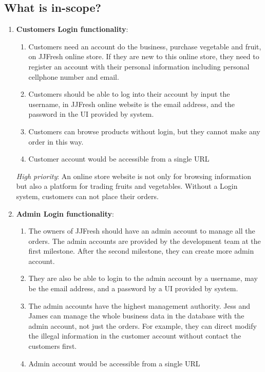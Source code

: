 \documentclass{report}
\begin{document}
\subsection{What is in-scope?}
\begin{enumerate}
  \item \textbf{Customers Login functionality}:
  \begin{enumerate}
    \item Customers need an account do the business, purchase vegetable and fruit, on JJFresh online store. If they are new to this online store, they need to register an account with their personal information including personal cellphone number and email.
    \item Customers should be able to log into their account by input the username, in JJFresh online website is the email address, and the password in the UI provided by system.
    \item Customers can browse products without login, but they cannot make any order in this way.
    \item Customer account would be accessible from a single URL
  \end{enumerate}

  \textit{High priority}: An online store website is not only for browsing information but also a platform for trading fruits and vegetables. Without a Login system, customers can not place their orders.

  \item \textbf{Admin Login functionality}:
  \begin{enumerate}
    \item The owners of JJFresh should have an admin account to manage all the orders. The admin accounts are provided by the development team at the first milestone. After the second milestone, they can create more admin account.
    \item They are also be able to login to the admin account by a username, may be the email address, and a password by a UI provided by system.
    \item The admin accounts have the highest management authority. Jess and James can manage the whole business data in the database with the admin account, not just the orders. For example, they can direct modify the illegal information in the customer account without contact the customers first.
    \item Admin account would be accessible from a single URL
  \end{enumerate}


\end{enumerate}
\end{document}
